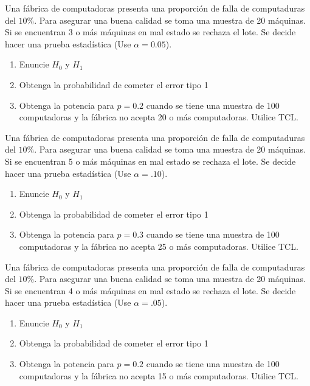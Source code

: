 \documentclass[addpoints]{exam}
\theoremstyle{mytheor}
\begin{document}
\begin{questions}
  \question Una fábrica de computadoras presenta una proporción de falla de computaduras del $10\%$. Para asegurar una buena calidad se toma una muestra de 20 máquinas. Si se encuentran 3 o más máquinas en mal estado se rechaza el lote. Se decide hacer una prueba estadística (Use $\alpha = 0.05$).
  \begin{enumerate}
  \item Enuncie $H_0$ y $H_1$
    \item Obtenga la probabilidad de cometer el error tipo 1
  \item Obtenga la potencia para $p = 0.2$ cuando se tiene una muestra de 100 computadoras y la fábrica no acepta 20 o más computadoras. Utilice TCL.
  \end{enumerate}
  
  \question Una fábrica de computadoras presenta una proporción de falla de computaduras del $10\%$. Para asegurar una buena calidad se toma una muestra de 20 máquinas. Si se encuentran 5 o más máquinas en mal estado se rechaza el lote. Se decide hacer una prueba estadística (Use $\alpha = .10$).
  \begin{enumerate}
  \item Enuncie $H_0$ y $H_1$
    \item Obtenga la probabilidad de cometer el error tipo 1
  \item Obtenga la potencia para $p = 0.3$ cuando se tiene una muestra de 100 computadoras y la fábrica no acepta 25 o más computadoras. Utilice TCL.
  \end{enumerate}
  
  \question Una fábrica de computadoras presenta una proporción de falla de computaduras del $10\%$. Para asegurar una buena calidad se toma una muestra de 20 máquinas. Si se encuentran 4 o más máquinas en mal estado se rechaza el lote. Se decide hacer una prueba estadística (Use $\alpha = .05$).
  \begin{enumerate}
  \item Enuncie $H_0$ y $H_1$
    \item Obtenga la probabilidad de cometer el error tipo 1
  \item Obtenga la potencia para $p = 0.2$ cuando se tiene una muestra de 100 computadoras y la fábrica no acepta 15 o más computadoras. Utilice TCL.
  \end{enumerate}
  
  \end{questions}
  
  
\end{document}

